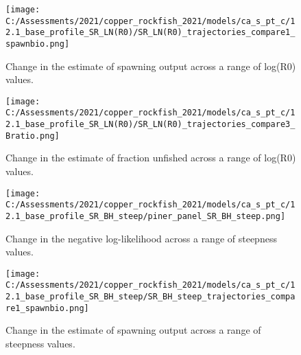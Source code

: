 \documentclass[11pt,
  english,
  a4paper,
]{article}
\begin{document}
\tagmcend\tagstructend


\begin{figure}
\centering
\texttt{[image: C:/Assessments/2021/copper\_rockfish\_2021/models/ca\_s\_pt\_c/12.1\_base\_profile\_SR\_LN(R0)/SR\_LN(R0)\_trajectories\_compare1\_spawnbio.png]}
\caption{Change in the estimate of spawning output across a range of log(R0) values.\label{fig:r0-ssb}}
\end{figure}

\tagmcend\tagstructend


\begin{figure}
\centering
\texttt{[image: C:/Assessments/2021/copper\_rockfish\_2021/models/ca\_s\_pt\_c/12.1\_base\_profile\_SR\_LN(R0)/SR\_LN(R0)\_trajectories\_compare3\_Bratio.png]}
\caption{Change in the estimate of fraction unfished across a range of log(R0) values.\label{fig:r0-depl}}
\end{figure}

\tagmcend\tagstructend


\begin{figure}
\centering
\texttt{[image: C:/Assessments/2021/copper\_rockfish\_2021/models/ca\_s\_pt\_c/12.1\_base\_profile\_SR\_BH\_steep/piner\_panel\_SR\_BH\_steep.png]}
\caption{Change in the negative log-likelihood across a range of steepness values.\label{fig:h-profile}}
\end{figure}

\tagmcend\tagstructend


\begin{figure}
\centering
\texttt{[image: C:/Assessments/2021/copper\_rockfish\_2021/models/ca\_s\_pt\_c/12.1\_base\_profile\_SR\_BH\_steep/SR\_BH\_steep\_trajectories\_compare1\_spawnbio.png]}
\caption{Change in the estimate of spawning output across a range of steepness values.\label{fig:h-ssb}}
\end{figure}
\end{document}
